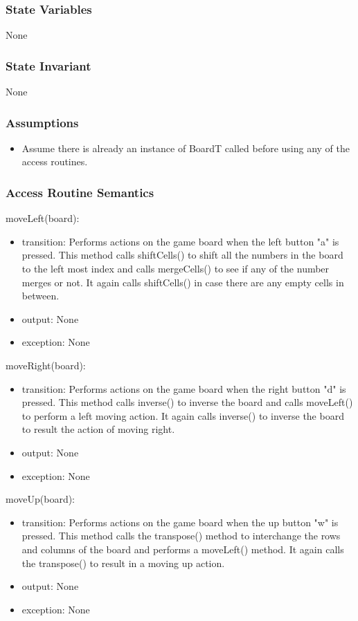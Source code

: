 \documentclass[12pt]{article}
\begin{document}
\subsubsection* {State Variables}
None

\subsubsection* {State Invariant}
None

\subsubsection* {Assumptions}
\begin{itemize}
  \item Assume there is already an instance of BoardT called before using any of the access routines.
\end{itemize}

\subsubsection* {Access Routine Semantics}

moveLeft(board):
\begin{itemize}
    \item transition: Performs actions on the game board when the left button "a" is pressed. This method calls shiftCells() to shift all the numbers in the board to the left most index and calls mergeCells() to see if any of the number merges or not. It again calls shiftCells() in case there are any empty cells in between.
    \item output: None
    \item exception: None
\end{itemize}

\noindent moveRight(board):
\begin{itemize}
    \item transition: Performs actions on the game board when the right button "d" is pressed. This method calls inverse() to inverse the board and calls moveLeft() to perform a left moving action. It again calls inverse() to inverse the board to result the action of moving right.
    \item output: None
    \item exception: None
\end{itemize}

\noindent moveUp(board):
\begin{itemize}
    \item transition: Performs actions on the game board when the up button "w" is pressed. This method calls the transpose() method to interchange the rows and columns of the board and performs a moveLeft() method. It again calls the transpose() to result in a moving up action.
    \item output: None
    \item exception: None
\end{itemize}
\end{document}
